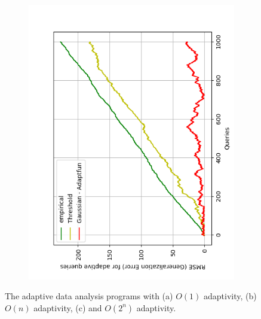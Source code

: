 {\begin{figure}
\begin{subfigure}{.3\textwidth}
\begin{centering}
\includegraphics[width=1.0\textwidth]{exp_adaptivity.png}
\caption{}
\end{centering}
\end{subfigure}
\vspace{-0.2cm}
 \caption{The adaptive data analysis programs with
 (a) $O(1)$ adaptivity, 
 (b) $O(n)$ adaptivity,
 (c) and $O(2^n)$ adaptivity.
}
\label{fig:implementation_generalization_errors}
\vspace{-0.6cm}
\end{figure}
}
